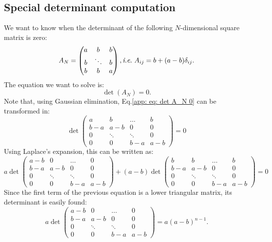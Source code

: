 \documentclass[12pt, titlepage, twoside, openright]{report}
\begin{document}
\subsection{Special determinant computation}\label{app : special determinant computation}
We want to know when the determinant of the following $N$-dimensional square matrix is zero:
\begin{equation}
A_N = \begin{pmatrix}
a & b & b  \\
b & \ddots & b  \\
b & b & a
\end{pmatrix}, \textit{i.e.} \ A_{ij} = b+(a-b)\delta_{ij}.
\end{equation}
The equation we want to solve is:
\begin{equation}
\det\left(A_N\right)=0. \label{app: eq: det A_N 0}
\end{equation}
Note that, using Gaussian elimination, Eq.\eqref{app: eq: det A_N 0} can be transformed in:
\begin{equation}
\det\begin{pmatrix}
a & b & \dots & b \\
b-a & a-b & 0 & 0 \\
0 & \ddots & \ddots & 0 \\
0 & 0 & b-a & a-b
\end{pmatrix}=0
\end{equation}
Using Laplace's expansion, this can be written as:
\begin{equation}
 a \det\begin{pmatrix}
a-b & 0 & \dots & 0 \\
b-a & a-b & 0 & 0 \\
0 & \ddots & \ddots & 0 \\
0 & 0 & b-a & a-b
\end{pmatrix}+(a-b)
\det\begin{pmatrix}
b & b & \dots & b \\
b-a & a-b & 0 & 0 \\
0 & \ddots & \ddots & 0 \\
0 & 0 & b-a & a-b
\end{pmatrix}=0 \label{app: eq: laplace expansion}
\end{equation}
Since the first term of the previous equation is a lower triangular matrix, its determinant is easily found:
\begin{equation}
a \det\begin{pmatrix}
a-b & 0 & \dots & 0 \\
b-a & a-b & 0 & 0 \\
0 & \ddots & \ddots & 0 \\
0 & 0 & b-a & a-b
\end{pmatrix} = a\left(a-b\right)^{n-1}.
\end{equation}
\end{document}
